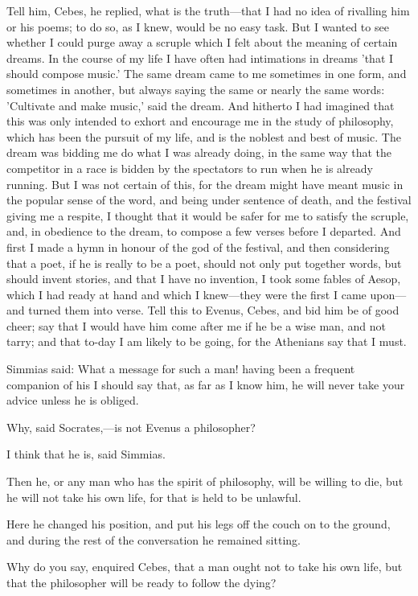 Tell him, Cebes, he replied, what is the truth—that I had no idea of
rivalling him or his poems; to do so, as I knew, would be no easy task.
But I wanted to see whether I could purge away a scruple which I felt
about the meaning of certain dreams. In the course of my life I have often
had intimations in dreams 'that I should compose music.' The same dream
came to me sometimes in one form, and sometimes in another, but always
saying the same or nearly the same words: 'Cultivate and make music,' said
the dream. And hitherto I had imagined that this was only intended to
exhort and encourage me in the study of philosophy, which has been the
pursuit of my life, and is the noblest and best of music. The dream was
bidding me do what I was already doing, in the same way that the
competitor in a race is bidden by the spectators to run when he is already
running. But I was not certain of this, for the dream might have meant
music in the popular sense of the word, and being under sentence of death,
and the festival giving me a respite, I thought that it would be safer for
me to satisfy the scruple, and, in obedience to the dream, to compose a
few verses before I departed. And first I made a hymn in honour of the god
of the festival, and then considering that a poet, if he is really to be a
poet, should not only put together words, but should invent stories, and
that I have no invention, I took some fables of Aesop, which I had ready
at hand and which I knew—they were the first I came upon—and
turned them into verse. Tell this to Evenus, Cebes, and bid him be of good
cheer; say that I would have him come after me if he be a wise man, and
not tarry; and that to-day I am likely to be going, for the Athenians say
that I must.

Simmias said: What a message for such a man! having been a frequent
companion of his I should say that, as far as I know him, he will never
take your advice unless he is obliged.

Why, said Socrates,—is not Evenus a philosopher?

I think that he is, said Simmias.

Then he, or any man who has the spirit of philosophy, will be willing to
die, but he will not take his own life, for that is held to be unlawful.

Here he changed his position, and put his legs off the couch on to the
ground, and during the rest of the conversation he remained sitting.

Why do you say, enquired Cebes, that a man ought not to take his own life,
but that the philosopher will be ready to follow the dying?

